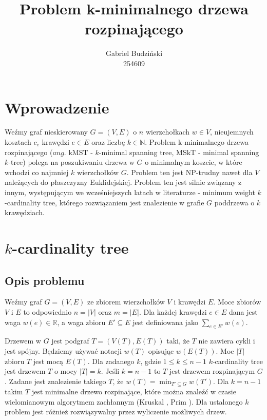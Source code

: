 \documentclass{article}
\title{Problem k-minimalnego drzewa rozpinającego}
\author{Gabriel Budziński\\254609}
\begin{document}
\maketitle

\section{Wprowadzenie}

Weźmy graf nieskierowany $G=(V,E)$ o $n$ wierzchołkach $w \in V$, nieujemnych kosztach $c_e$ krawędzi $e \in E$ oraz liczbę $k \in \mathbb{N}$. Problem k-minimalnego drzewa rozpinającego ($\textit{ang.}$ kMST - $k$-minimal spanning tree, MSkT - minimal spanning $k$-tree) polega na poszukiwaniu drzewa w $G$ o minimalnym koszcie, w które wchodzi co najmniej $k$ wierzchołków $G$. Problem ten jest NP-trudny nawet dla $V$ należących do płaszczyzny Euklidejskiej. Problem ten jest silnie związany z innym, występującym we wcześniejszych latach w literaturze \cite{k_card_trees} - minimum weight $k$-cardinality tree, którego rozwiązaniem jest znalezienie w grafie $G$ poddrzewa o $k$ krawędziach.

\section{$k$-cardinality tree}

\subsection{Opis problemu}
Weźmy graf $G = (V,E)$ ze zbiorem wierzchołków $V$ i krawędzi $E$. Moce zbiorów $V$ i $E$ to odpowiednio $n = |V|$ oraz $m = |E|$. Dla każdej krawędzi $e \in E$ dana jest waga $w(e) \in \mathbb{R}$, a waga zbioru $E' \subseteq E$ jest definiowana jako $\sum_{e \in E'}{w(e)}$.

Drzewem w $G$ jest podgraf $T = (V(T), E(T))$ taki, że $T$ nie zawiera cykli i jest spójny. Będziemy używać notacji $w(T)$ opisując $w(E(T))$. Moc $|T|$ zbioru $T$ jest mocą $E(T)$. Dla zadanego $k$, gdzie $1 \leq k \leq n-1$ $k$-cardinality tree jest drzewem $T$ o mocy $|T| = k$. Jeśli $k = n-1$ to $T$ jest drzewem rozpinającym $G$. Zadane jest znalezienie takiego $T$, że $w(T) = \min_{T' \subseteq G}{w(T')}$. Dla $k = n-1$ takim $T$ jest minimalne drzewo rozpinające, które można znaleźć w czasie wielomianowym algorytmem zachłannym (Kruskal \cite{kruskal}, Prim \cite{prim}). Dla ustalonego $k$ problem jest różnież rozwiązywalny przez wyliczenie możliwych drzew.
\end{document}
